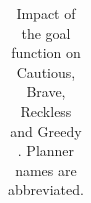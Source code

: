 \documentclass[11pt,landscape]{article}
\begin{document}
\begin{table}[tb]
{\begin{tabular}{|l||ccccccccc||ccccccccc||}
        \end{tabular}}
        \caption{Impact of the goal function on Cautious, Brave, Reckless and Greedy \pattyd. Planner names are abbreviated.}
        \label{tab:abl-gf}
        \end{table}
        
\end{document}
